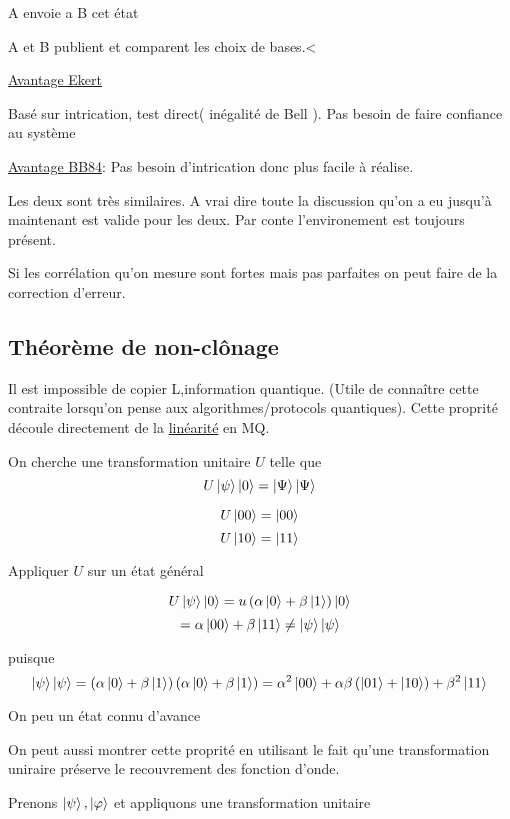 A envoie a B cet état

A et B publient et comparent les choix de bases.<


\underline{Avantage Ekert} 

Basé sur intrication, test direct( inégalité de Bell ). Pas besoin de faire confiance au système

\underline{Avantage BB84}: Pas besoin d'intrication donc plus facile à réalise.

\begin{tcolorbox}[title=Différence entre Ève et l'environement]
     Les deux sont très similaires. A vrai dire toute la discussion qu'on a eu jusqu'à maintenant est valide pour les deux. Par conte l'environement est toujours présent.

Si les corrélation qu'on mesure sont fortes mais pas parfaites on peut faire de la correction d'erreur.
\end{tcolorbox}

\subsection{Théorème de non-clônage}

Il est impossible de copier L,information quantique. (Utile de connaître cette contraite lorsqu'on pense aux algorithmes/protocols quantiques). Cette proprité découle directement de la \underline{linéarité} en MQ.

On cherche une transformation unitaire $U$ telle que
$$U \ket{\psi}\ket{0} = \ket{\Psi}\ket{\Psi}$$ 

$$U \ket{00} = \ket{00}$$ 
$$U \ket{10} = \ket{11}$$ 

Appliquer $U$ sur un état général 

$$U \ket{\psi} \ket{0} =u \left( \alpha \ket{0} + \beta \ket{1} \right) \ket{0}$$ 
 $$= \alpha \ket{00} + \beta \ket{11} \neq \ket{\psi}\ket{\psi}$$ 


 puisque $$\ket{\psi}\ket{\psi} = \left( \alpha \ket{0} + \beta \ket{1} \right)\left( \alpha \ket{0} + \beta \ket{1} \right) = \alpha^{2}\ket{00} + \alpha \beta \left( \ket{01} + \ket{10} \right) + \beta^{2}\ket{11} $$ 


On peu  un état connu d'avance

On peut aussi montrer cette proprité en utilisant le fait qu'une transformation uniraire préserve le recouvrement des fonction d'onde.

Prenons $\ket{\psi}, \ket{\varphi}$ et appliquons une transformation unitaire

